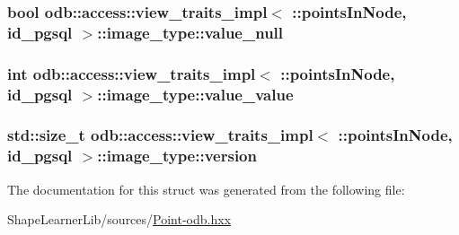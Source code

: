 \subsubsection[{value\+\_\+null}]{\setlength{\rightskip}{0pt plus 5cm}bool odb\+::access\+::view\+\_\+traits\+\_\+impl$<$ \+::{\bf points\+In\+Node}, id\+\_\+pgsql $>$\+::image\+\_\+type\+::value\+\_\+null}\label{structodb_1_1access_1_1view__traits__impl_3_01_1_1points_in_node_00_01id__pgsql_01_4_1_1image__type_abafdefff55542ee083dbd9b32a575a3e}
\hypertarget{structodb_1_1access_1_1view__traits__impl_3_01_1_1points_in_node_00_01id__pgsql_01_4_1_1image__type_a12f469d5bfe008819719093011ba4194}{}
\subsubsection[{value\+\_\+value}]{\setlength{\rightskip}{0pt plus 5cm}int odb\+::access\+::view\+\_\+traits\+\_\+impl$<$ \+::{\bf points\+In\+Node}, id\+\_\+pgsql $>$\+::image\+\_\+type\+::value\+\_\+value}\label{structodb_1_1access_1_1view__traits__impl_3_01_1_1points_in_node_00_01id__pgsql_01_4_1_1image__type_a12f469d5bfe008819719093011ba4194}
\hypertarget{structodb_1_1access_1_1view__traits__impl_3_01_1_1points_in_node_00_01id__pgsql_01_4_1_1image__type_aee7068036e4034c258414d58c08360a3}{}
\subsubsection[{version}]{\setlength{\rightskip}{0pt plus 5cm}std\+::size\+\_\+t odb\+::access\+::view\+\_\+traits\+\_\+impl$<$ \+::{\bf points\+In\+Node}, id\+\_\+pgsql $>$\+::image\+\_\+type\+::version}\label{structodb_1_1access_1_1view__traits__impl_3_01_1_1points_in_node_00_01id__pgsql_01_4_1_1image__type_aee7068036e4034c258414d58c08360a3}


The documentation for this struct was generated from the following file\+:\begin{DoxyCompactItemize}
\item 
Shape\+Learner\+Lib/sources/\hyperlink{_point-odb_8hxx}{Point-\/odb.\+hxx}\end{DoxyCompactItemize}
